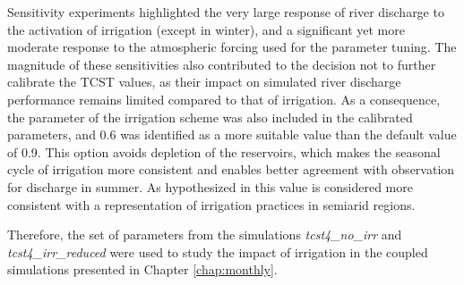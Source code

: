 Sensitivity experiments highlighted the very large response of river discharge to the activation of irrigation (except in winter), and a significant yet more moderate response to the atmospheric forcing used for the parameter tuning. 
The magnitude of these sensitivities also contributed to the decision not to further calibrate the TCST values, as their impact on simulated river discharge performance remains limited compared to that of irrigation.
As a consequence, the \betairrig parameter of the irrigation scheme was also included in the calibrated parameters, and 0.6 was identified as a more suitable value than the default value of 0.9. This option avoids depletion of the reservoirs, which makes the seasonal cycle of irrigation more consistent and enables better agreement with observation for discharge in summer. As hypothesized in \citet{arboleda-obando_validation_2024} this value is considered more consistent with a representation of irrigation practices in semiarid regions.

Therefore, the set of parameters from the simulations \textit{tcst4\_no\_irr} and \textit{tcst4\_irr\_reduced} were used to study the impact of irrigation in the coupled simulations presented in Chapter \ref{chap:monthly}.
